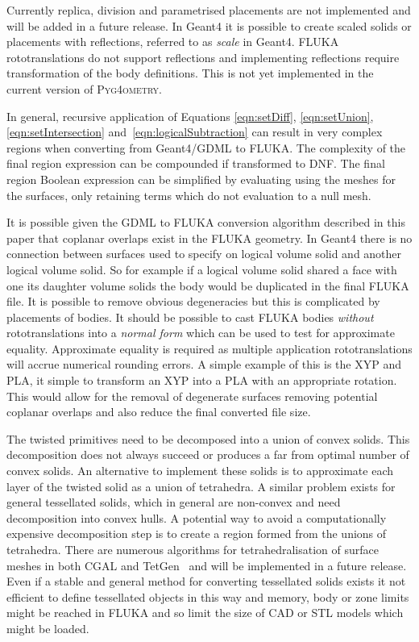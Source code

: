 \documentclass[final,5p,times,twocolumn]{elsarticle}
\newcommand{\PYGEOMETRY}{\textsc{Pyg4ometry}}
\begin{document}
Currently replica, division and parametrised placements are not implemented 
and will be added in a future release. In Geant4 it is possible to create scaled 
solids or placements with reflections, referred to as \emph{scale} in Geant4. FLUKA 
rototranslations do not support reflections and implementing reflections 
require transformation of the body definitions. This is not yet implemented 
in the current version of \PYGEOMETRY{}. 

In general, recursive application of Equations \ref{eqn:setDiff},
\ref{eqn:setUnion}, \ref{eqn:setIntersection} and~\ref{eqn:logicalSubtraction} 
can result in very complex regions when converting from Geant4/GDML to 
FLUKA. The complexity of the final region expression can be compounded 
if transformed to DNF. The final region Boolean expression can be simplified by 
evaluating using the meshes for the surfaces, only retaining terms which 
do not evaluation to a null mesh.

It is possible given the GDML to FLUKA conversion algorithm described 
in this paper that coplanar overlaps exist in the FLUKA geometry.  In 
Geant4 there is no connection between surfaces used to specify on 
logical volume solid and another logical volume solid. So for example 
if a logical volume solid shared a face with one its daughter volume 
solids the body would be duplicated in the final FLUKA file. It 
is possible to remove obvious degeneracies but this is complicated by 
placements of bodies. It should be possible to cast FLUKA bodies 
{\em without} rototranslations into a {\em normal form} which can be used 
to test for approximate equality. Approximate equality is required as 
multiple application rototranslations will accrue numerical rounding errors.
A simple example of this is the XYP and PLA, it simple to transform an 
XYP into a PLA with an appropriate rotation. This would allow for the removal 
of degenerate surfaces removing potential coplanar overlaps and also reduce 
the final converted file size.

The twisted primitives need to be decomposed 
into a union of convex solids. This decomposition does not always 
succeed or produces a far from optimal number of convex solids. 
An alternative to implement these solids is to approximate each 
layer of the twisted solid as a union of tetrahedra. A similar problem 
exists for general tessellated solids, which in general
are non-convex and need decomposition into convex hulls. A potential 
way to avoid a computationally expensive decomposition step is to 
create a region formed from the unions of tetrahedra. There are numerous 
algorithms for tetrahedralisation of surface meshes in both CGAL and TetGen~\cite{tetgen}
and will be implemented in a future release. Even if a stable and general 
method for converting tessellated solids exists it not efficient to define 
tessellated objects in this way and memory, body or zone limits might
be reached in FLUKA and so limit the size of CAD or STL models which 
might be loaded.
\end{document}

